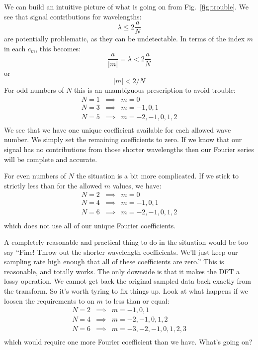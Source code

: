 \documentclass[12pt]{article}
\begin{document}
We can build an intuitive picture of what is going on from Fig.~\ref{fig:trouble}.  We see that signal
contributions for wavelengths:
$$\lambda \leq 2\frac{a}{N}$$
are potentially problematic, as they can be undetectable.
In terms of the index $m$ in each $c_m$, this becomes:
$$\frac{a}{|m|} = \lambda < 2\frac{a}{N}$$
or
$$|m| < 2/N$$
For odd numbers of $N$ this is an unambiguous prescription to avoid trouble:
\begin{eqnarray*}
  N=1 &\implies& m = 0 \\
  N=3 &\implies& m = -1,0,1 \\
  N=5 &\implies& m = -2,-1,0,1,2 \\
\end{eqnarray*}
We see that we have one unique coefficient available for each allowed
wave number.  We simply set the remaining coefficients to zero.  If we
know that our signal has no contributions from those shorter
wavelengths then our Fourier series will be complete and accurate.

For even numbers of $N$ the situation is a bit more complicated.  If we stick to strictly less than for the allowed $m$ values, we have:
\begin{eqnarray*}
  N=2 &\implies& m = 0 \\
  N=4 &\implies& m = -1,0,1 \\
  N=6 &\implies& m = -2,-1,0,1,2 \\
\end{eqnarray*}
which does not use all of our unique Fourier coefficients.

A completely reasonable and practical thing to do in the situation
would be too say ``Fine! Throw out the shorter wavelength coefficients.
We'll just keep our sampling rate high enough that all of these
coefficients are zero.''  This is reasonable, and totally works.
The only downside is that it makes the DFT a lossy operation.  We
cannot get back the original sampled data back exactly from the
transform.  So it's worth tyring to fix things up.  Look at what
happens if we loosen the requirements to on $m$ to less than or equal:
\begin{eqnarray*}
  N=2 &\implies& m = -1,0,1 \\
  N=4 &\implies& m = -2,-1,0,1,2 \\
  N=6 &\implies& m = -3,-2,-1,0,1,2,3 \\
\end{eqnarray*}
which would require one more Fourier coefficient than we have.  What's
going on?
\end{document}
